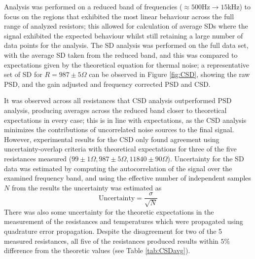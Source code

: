 \documentclass[aps,prl,twocolumn,superscriptaddress]{revtex4-1}
\begin{document}
Analysis was performed on a reduced band of frequencies ($\approx500$Hz$\to15$kHz) to focus on the regions that exhibited the most linear behaviour across the full range of analyzed resistors; this allowed for calculation of average SDs where the signal exhibited the expected behaviour whilst still retaining a large number of data points for the analysis. The SD analysis was performed on the full data set, with the average SD taken from the reduced band, and this was compared to expectations given by the theoretical equation for thermal noise; a representative set of SD for $R=987\pm5\Omega$ can be observed in Figure \ref{fig:CSD}, showing the raw PSD, and the gain adjusted and frequency corrected PSD and CSD.

It was observed across all resistances that CSD analysis outperformed PSD analysis, producing averages across the reduced band closer to theoretical expectations in every case; this is in line with expectations, as the CSD analysis minimizes the contributions of uncorrelated noise sources to the final signal. However, experimental results for the CSD only found agreement using uncertainty-overlap criteria with theoretical expectations for three of the five resistances measured ($99\pm1\Omega, 987\pm5\Omega, 11840\pm90\Omega$). Uncertainty for the SD data was estimated by computing the autocorrelation of the signal over the examined frequency band, and using the effective number of independent samples $N$ from the results the uncertainty was estimated as
\begin{equation}
	\text{Uncertainty} = \frac{\sigma}{\sqrt{N}}
\end{equation}
There was also some uncertainty for the theoretic expectations in the measurement of the resistances and temperatures which were propagated using quadrature error propagation. Despite the disagreement for two of the 5 measured resistances, all five of the resistances produced results within $5\%$ difference from the theoretic values (see Table \ref{tab:CSDavg}).

\begin{table}[ht]
\centering
{}
\caption{Average thermal noise CSD and theoretical thermal noise SD for each measured resistor, with percent difference relative to theoretical expectation.}
\label{tab:CSDavg}
\end{table}
\end{document}
